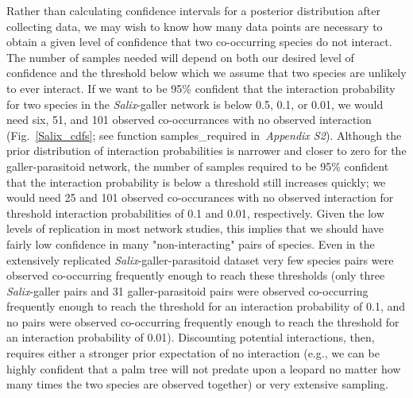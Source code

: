 \documentclass[12pt]{article}
\begin{document}
      Rather than calculating confidence intervals for a posterior distribution after collecting data, we may wish to know how many data points are necessary to obtain a given level of confidence that two co-occurring species do not interact. The number of samples needed will depend on both our desired level of confidence and the threshold below which we assume that two species are unlikely to ever interact. If we want to be 95\% confident that the interaction probability for two species in the \emph{Salix}-galler network is below 0.5, 0.1, or 0.01, we would need six, 51, and 101 observed co-occurrances with no observed interaction (Fig.~\ref{Salix_cdfs}; see function samples\_required in~\emph{Appendix S2}). 
      Although the prior distribution of interaction probabilities is narrower and closer to zero for the galler-parasitoid network, the number of samples required to be 95\% confident that the interaction probability is below a threshold still increases quickly; we would need 25 and 101 observed co-occurances with no observed interaction for threshold interaction probabilities of 0.1 and 0.01, respectively.
      Given the low levels of replication in most network studies, this implies that we should have fairly low confidence in many "non-interacting" pairs of species. Even in the extensively replicated \emph{Salix}-galler-parasitoid dataset very few species pairs were observed co-occurring frequently enough to reach these thresholds (only three \emph{Salix}-galler pairs and 31 galler-parasitoid pairs were observed co-occurring frequently enough to reach the threshold for an interaction probability of 0.1, and no pairs were observed co-occurring frequently enough to reach the threshold for an interaction probability of 0.01). Discounting potential interactions, then, requires either a stronger prior expectation of no interaction (e.g., we can be highly confident that a palm tree will not predate upon a leopard no matter how many times the two species are observed together) or very extensive sampling.
\end{document}
